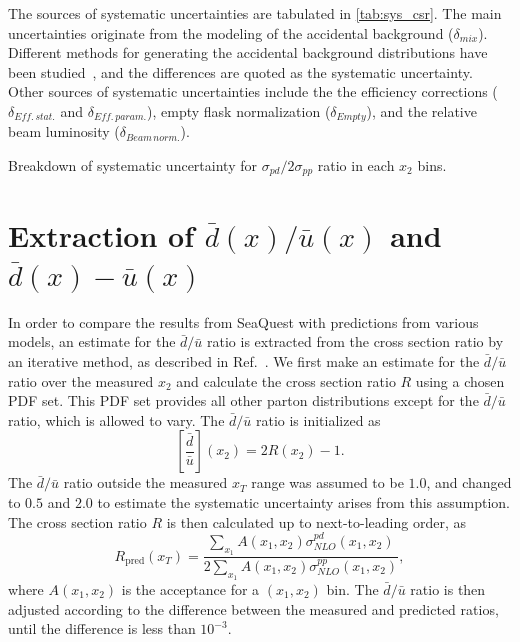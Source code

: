 \documentclass[reprint,aps,unsortedaddress,superscriptaddress,prc,floatfix,showpacs,linenumbers,final]{revtex4-2}
\begin{document}
The sources of systematic uncertainties are tabulated in \cref{tab:sys_csr}.
The main uncertainties originate from the modeling of the accidental background ($\delta_{mix}$). 
Different methods for generating the accidental background distributions have been studied~\cite{pate2023},
and the differences are quoted as the systematic uncertainty.
Other sources of systematic uncertainties include the the efficiency corrections ($\delta_{Eff.\,stat.}$ and $\delta_{Eff.\,param.}$),
empty flask normalization ($\delta_{Empty}$), and the relative beam luminosity ($\delta_{Beam\,norm.}$).
\begin{table}
	\centering
	\caption{Breakdown of systematic uncertainty for $\sigma_{pd}/2\sigma_{pp}$ ratio in each $x_2$ bins.}
	\label{tab:sys_csr}
	\begin{adjustbox}{max width=\linewidth}
		
	\end{adjustbox}
\end{table}

\section{Extraction of \texorpdfstring{$\bar{d}\left(x\right)/\bar{u}\left(x\right)$}{dbar(x)/ubar(x)}
  and \texorpdfstring{$\bar{d}\left(x\right)-\bar{u}\left(x\right)$}{dbar(x)-ubar(x)}}
\label{sec:extraction}
In order to compare the results from SeaQuest with predictions from various models,
an estimate for the $\bar{d}/\bar{u}$ ratio is extracted from the cross section ratio by
an iterative method, as described in Ref.~\cite{dove2021}.
We first make an estimate for the $\bar{d}/\bar{u}$ ratio over the measured $x_2$
and calculate the cross section ratio $R$ using a chosen PDF set.
This PDF set provides all other parton distributions except for the $\bar{d}/\bar{u}$ ratio,
which is allowed to vary. The $\bar{d}/\bar{u}$ ratio is initialized as
\begin{equation}
	\left[\frac{\bar{d}}{\bar{u}}\right]\left(x_2\right) = 2R\left(x_2\right)-1.
\end{equation}
The $\bar{d}/\bar{u}$ ratio outside the measured $x_T$ range was assumed to be $1.0$,
and changed to $0.5$ and $2.0$ to estimate the systematic uncertainty arises from this assumption.
The cross section ratio $R$ is then calculated up to next-to-leading order, as
\begin{equation}
	R_{\mathrm{pred}}\left(x_T\right)  = \frac{\sum_{x_1} A\left(x_1, x_2\right)\sigma^{pd}_{NLO}\left(x_1, x_2\right)}{2\sum_{x_1} A\left(x_1, x_2\right)\sigma^{pp}_{NLO}\left(x_1, x_2\right)},
\end{equation}
where $A\left(x_1,x_2\right)$ is the acceptance for a $\left(x_1, x_2\right)$ bin.
The $\bar{d}/\bar{u}$ ratio is then adjusted according to the difference between
the measured and predicted ratios, until the difference is less than $10^{-3}$.
\end{document}
